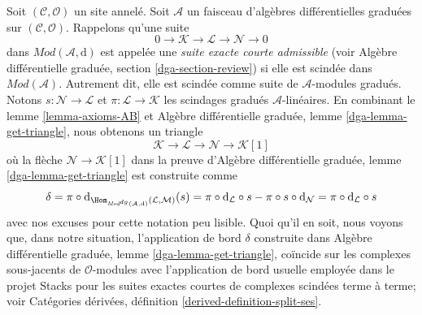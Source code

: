 \noindent
Soit $(\mathcal{C}, \mathcal{O})$ un site annelé.
Soit $\mathcal{A}$ un faisceau d'algèbres différentielles graduées sur $(\mathcal{C}, \mathcal{O})$.
Rappelons qu'une suite
$$
0 \to \mathcal{K} \to \mathcal{L} \to \mathcal{N} \to 0
$$
dans $\textit{Mod}(\mathcal{A}, \text{d})$ est appelée une {\it suite exacte courte admissible} (voir Algèbre différentielle graduée, section \ref{dga-section-review}) si elle est scindée dans $\textit{Mod}(\mathcal{A})$.
Autrement dit, elle est scindée comme suite de $\mathcal{A}$-modules gradués.
Notons $s : \mathcal{N} \to \mathcal{L}$ et $\pi : \mathcal{L} \to \mathcal{K}$ les scindages gradués $\mathcal{A}$-linéaires.
En combinant le lemme \ref{lemma-axioms-AB} et Algèbre différentielle graduée, lemme \ref{dga-lemma-get-triangle}, nous obtenons un triangle
$$
\mathcal{K} \to \mathcal{L} \to \mathcal{N} \to \mathcal{K}[1]
$$
où la flèche $\mathcal{N} \to \mathcal{K}[1]$ dans la preuve d'Algèbre différentielle graduée, lemme \ref{dga-lemma-get-triangle}  est construite comme
$$
\delta = \pi \circ
\text{d}_{\Hom_{\textit{Mod}^{dg}(\mathcal{A}, \text{d})}
(\mathcal{L}, \mathcal{M})}(s) =
\pi \circ \text{d}_\mathcal{L} \circ s -
\pi \circ s \circ \text{d}_\mathcal{N} =
\pi \circ \text{d}_\mathcal{L} \circ s
$$
avec nos excuses pour cette notation peu lisible.
Quoi qu'il en soit, nous voyons que, dans notre situation, l'application de bord $\delta$ construite dans Algèbre différentielle graduée, lemme \ref{dga-lemma-get-triangle}, coïncide sur les complexes sous-jacents de $\mathcal{O}$-modules avec l'application de bord usuelle employée dans le projet Stacks pour les suites exactes courtes de complexes scindées terme à terme; voir Catégories dérivées, définition \ref{derived-definition-split-ses}.

